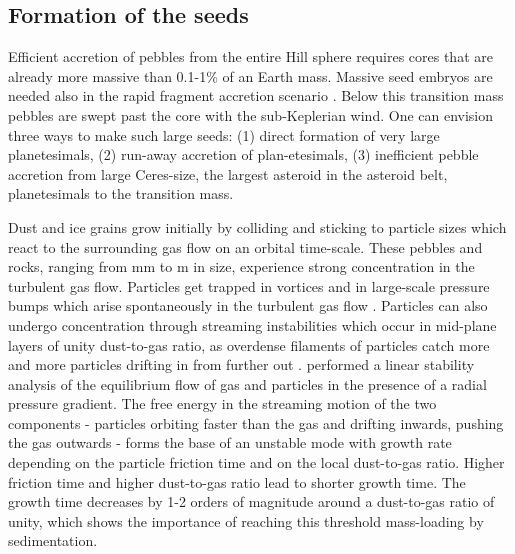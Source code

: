 \subsection{Formation of the seeds}
Efficient accretion of pebbles from the entire Hill sphere requires cores that are already more massive than 0.1-1\%
of an Earth mass. Massive seed embryos are needed also in the rapid fragment accretion scenario \citep{Rafikov2011}. 
Below this transition mass pebbles are swept past the core with the sub-Keplerian wind. One can envision
three ways to make such large seeds: 
(1) direct formation of very large planetesimals, 
(2) run-away accretion of  plan-etesimals, 
(3) inefficient pebble accretion from large Ceres-size, the largest asteroid in the asteroid belt, planetesimals
to the transition mass.

Dust and ice grains grow initially by colliding and sticking to particle sizes which react to the surrounding gas flow
on an orbital time-scale. These pebbles and rocks, ranging from mm to m in size, experience strong concentration 
in the turbulent gas flow. Particles get trapped in vortices \citep{Barge1995, Klahr2003} and in large-scale pressure bumps which arise spontaneously in the turbulent gas flow \citep{Johansen2009b}.
Particles can also undergo concentration through streaming instabilities which occur in mid-plane layers of unity
dust-to-gas ratio, as overdense filaments of particles catch more and more particles drifting in from further out 
\citep{Youdin2005, Johansen2007a, Johansen2009a, Bai2010}. 
\cite{Youdin2005} performed a linear stability analysis of the equilibrium flow of gas and particles in the presence of a radial
pressure gradient. The free energy in the streaming motion of the two components - particles orbiting faster than
the gas and drifting inwards, pushing the gas outwards - forms the base of an unstable mode with growth rate 
depending on the particle friction time and on the local dust-to-gas ratio. Higher friction time and higher dust-to-gas 
ratio lead to shorter growth time. The growth time decreases by 1-2 orders of magnitude around a dust-to-gas ratio of
unity, which shows the importance of reaching this threshold mass-loading by sedimentation.


